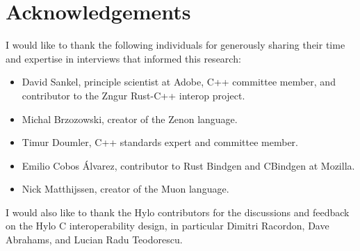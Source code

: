 \section*{Acknowledgements}
I would like to thank the following individuals for generously sharing their time and expertise in interviews that informed this research:
\begin{itemize}
    \item David Sankel, principle scientist at Adobe, C++ committee member, and contributor to the Zngur Rust-C++ interop project\cite{zngur}.
    \item Michal Brzozowski, creator of the Zenon language\cite{zenon-lang}.
    \item Timur Doumler, C++ standards expert and committee member.
    \item Emilio Cobos Álvarez, contributor to Rust Bindgen\cite{rust-bindgen} and CBindgen\cite{cbindgen} at Mozilla.
    \item Nick Matthijssen, creator of the Muon language.
\end{itemize}
I would also like to thank the Hylo contributors for the discussions and feedback on the Hylo C interoperability design, in particular Dimitri Racordon, Dave Abrahams, and Lucian Radu Teodorescu.